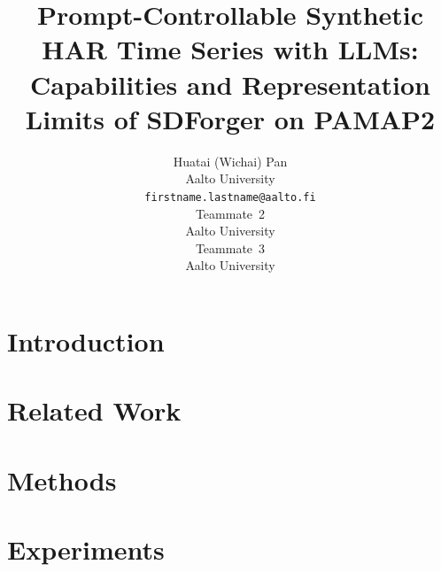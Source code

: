 \documentclass{article}
\title{Prompt-Controllable Synthetic HAR Time Series with LLMs:\\
Capabilities and Representation Limits of SDForger on PAMAP2}
\author{%
  Huatai (Wichai) Pan \\
  Aalto University \\
  \texttt{firstname.lastname@aalto.fi} \\
  \And
  Teammate~2 \\ Aalto University \\
  \And
  Teammate~3 \\ Aalto University \\
}
\begin{document}
\maketitle


\begin{abstract}
\end{abstract}


\section{Introduction}
\label{sec:intro}


\section{Related Work}
\label{sec:related}


\section{Methods}
\label{sec:methods}


\section{Experiments}
\label{sec:experiments}
\end{document}
